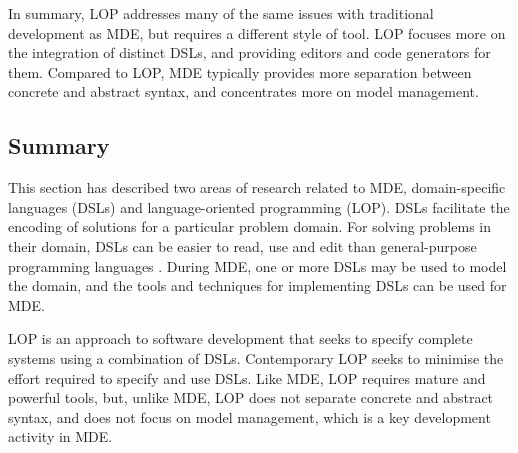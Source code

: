 In summary, LOP addresses many of the same issues with traditional development as MDE, but requires a different style of tool. LOP focuses more on the integration of distinct DSLs, and providing editors and code generators for them. Compared to LOP, MDE typically provides more separation between concrete and abstract syntax, and concentrates more on model management.

\subsection{Summary}
This section has described two areas of research related to MDE, domain-specific languages (DSLs) and language-oriented programming (LOP). DSLs facilitate the encoding of solutions for a particular problem domain. For solving problems in their domain, DSLs can be easier to read, use and edit than general-purpose programming languages \cite{deursen00dslbib,fowler10dsls}. During MDE, one or more DSLs may be used to model the domain, and the tools and techniques for implementing DSLs can be used for MDE.

LOP is an approach to software development that seeks to specify complete systems using a combination of DSLs. Contemporary LOP seeks to minimise the effort required to specify and use DSLs. Like MDE, LOP requires mature and powerful tools, but, unlike MDE, LOP does not separate concrete and abstract syntax, and does not focus on model management, which is a key development activity in MDE.
